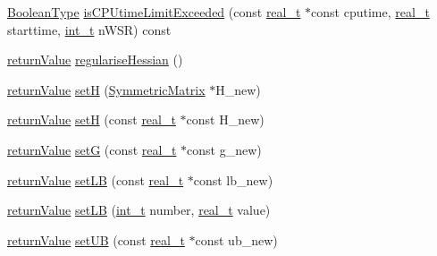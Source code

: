 \begin{DoxyCompactItemize}
\item 
\hyperlink{_types_8hpp_a20f82124c82b6f5686a7fce454ef9089}{Boolean\+Type} \hyperlink{class_q_problem_b_a3d6d1ee2af466d9366ecd58444bff94d}{is\+C\+P\+Utime\+Limit\+Exceeded} (const \hyperlink{qp_o_a_s_e_s__wrapper_8h_a0d00e2b3dfadee81331bbb39068570c4}{real\+\_\+t} $\ast$const cputime, \hyperlink{qp_o_a_s_e_s__wrapper_8h_a0d00e2b3dfadee81331bbb39068570c4}{real\+\_\+t} starttime, \hyperlink{_types_8hpp_ab6fd6105e64ed14a0c9281326f05e623}{int\+\_\+t} n\+W\+SR) const
\item 
\hyperlink{_message_handling_8hpp_a81d556f613bfbabd0b1f9488c0fa865e}{return\+Value} \hyperlink{class_q_problem_b_a8377ea426acc7a7b78a0c78944ded1b4}{regularise\+Hessian} ()
\item 
\hyperlink{_message_handling_8hpp_a81d556f613bfbabd0b1f9488c0fa865e}{return\+Value} \hyperlink{class_q_problem_b_ac9ca851c00d04f7f052a306f0f9f74ce}{setH} (\hyperlink{class_symmetric_matrix}{Symmetric\+Matrix} $\ast$H\+\_\+new)
\item 
\hyperlink{_message_handling_8hpp_a81d556f613bfbabd0b1f9488c0fa865e}{return\+Value} \hyperlink{class_q_problem_b_a5cb41e48d8508f561324a3b2c8155755}{setH} (const \hyperlink{qp_o_a_s_e_s__wrapper_8h_a0d00e2b3dfadee81331bbb39068570c4}{real\+\_\+t} $\ast$const H\+\_\+new)
\item 
\hyperlink{_message_handling_8hpp_a81d556f613bfbabd0b1f9488c0fa865e}{return\+Value} \hyperlink{class_q_problem_b_a4a907eb6c1a6ead3bf13335ce71ba069}{setG} (const \hyperlink{qp_o_a_s_e_s__wrapper_8h_a0d00e2b3dfadee81331bbb39068570c4}{real\+\_\+t} $\ast$const g\+\_\+new)
\item 
\hyperlink{_message_handling_8hpp_a81d556f613bfbabd0b1f9488c0fa865e}{return\+Value} \hyperlink{class_q_problem_b_a7d3cb375ddce99f8728a9be54207d542}{set\+LB} (const \hyperlink{qp_o_a_s_e_s__wrapper_8h_a0d00e2b3dfadee81331bbb39068570c4}{real\+\_\+t} $\ast$const lb\+\_\+new)
\item 
\hyperlink{_message_handling_8hpp_a81d556f613bfbabd0b1f9488c0fa865e}{return\+Value} \hyperlink{class_q_problem_b_a1e3a58f51f4ac880f2584580074b1608}{set\+LB} (\hyperlink{_types_8hpp_ab6fd6105e64ed14a0c9281326f05e623}{int\+\_\+t} number, \hyperlink{qp_o_a_s_e_s__wrapper_8h_a0d00e2b3dfadee81331bbb39068570c4}{real\+\_\+t} value)
\item 
\hyperlink{_message_handling_8hpp_a81d556f613bfbabd0b1f9488c0fa865e}{return\+Value} \hyperlink{class_q_problem_b_a529829d8e9a31570bbf11c26d7c3525a}{set\+UB} (const \hyperlink{qp_o_a_s_e_s__wrapper_8h_a0d00e2b3dfadee81331bbb39068570c4}{real\+\_\+t} $\ast$const ub\+\_\+new)

\end{DoxyCompactItemize}
